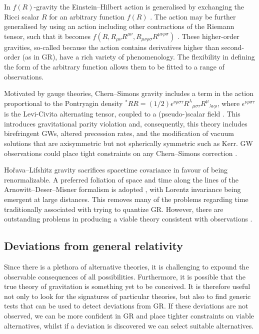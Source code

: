 In $f(R)$-gravity the Einstein--Hilbert action is generalised by exchanging the Ricci scalar $R$ for an arbitrary function $f(R)$ \citep{Buchdahl1970, Sotiriou2010, DeFelice2010}. The action may be further generalised by using an action including other contractions of the Riemann tensor, such that it becomes $f(R, R_{\mu\nu}R^{\mu\nu}, R_{\mu\nu\rho\sigma}R^{\mu\nu\rho\sigma})$ \citep{Madsen1989, Farhoudi2006, Nojiri2011}. These higher-order gravities, so-called because the action contains derivatives higher than second-order (as in GR), have a rich variety of phenomenology. The flexibility in defining the form of the arbitrary function allows them to be fitted to a range of observations.

Motivated by gauge theories, Chern--Simons gravity includes a term in the action proportional to the Pontryagin density ${^\ast R} R = (1/2)\epsilon^{\nu\rho\sigma\tau}{R^\lambda}_{\mu\sigma\tau}{R^\mu}_{\lambda\nu\rho}$, where $\epsilon^{\nu\rho\sigma\tau}$ is the Levi-Civita alternating tensor, coupled to a (pseudo-)scalar field \citep{Jackiw2003, Smith2008, Alexander2009a}. This introduces gravitational parity violation and, consequently, this theory includes birefringent GWs, altered precession rates, and the modification of vacuum solutions that are axisymmetric but not spherically symmetric such as Kerr. GW observations could place tight constraints on any Chern--Simons correction \citep{Canizares2012}.

Ho\v{r}ava--Lifshitz gravity \citep{Horava2009, Sotiriou2009c, Blas2010a} sacrifices spacetime covariance in favour of being renormalizable. A preferred foliation of space and time along the lines of the Arnowitt--Deser--Misner formalism is adopted \citep{Arnowitt1962a}, with Lorentz invariance being emergent at large distances. This removes many of the problems regarding time traditionally associated with trying to quantize GR. However, there are outstanding problems in producing a viable theory consistent with observations \citep{Sotiriou2010a}.

\subsection{Deviations from general relativity}

Since there is a plethora of alternative theories, it is challenging to expound the observable consequences of all possibilities. Furthermore, it is possible that the true theory of gravitation is something yet to be conceived. It is therefore useful not only to look for the signatures of particular theories, but also to find generic tests that can be used to detect deviations from GR. If these deviations are not observed, we can be more confident in GR and place tighter constraints on viable alternatives, whilst if a deviation is discovered we can select suitable alternatives.

